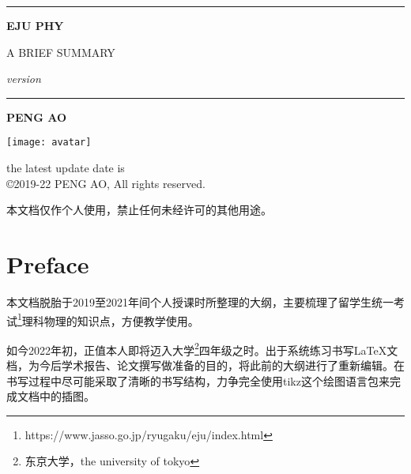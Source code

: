 
\begin{titlepage}
    \begin{center}
        \vspace{4cm}
        
        \rule{\textwidth}{1.2pt}
        
        \vspace{0.3cm}

        {\Huge \textbf{EJU PHY}}

        \vspace{0.3cm}

        {\LARGE A BRIEF SUMMARY}

        \vspace{0.3cm}

        {\Large \textit{version \version}}

        \rule{\textwidth}{1.2pt}

        \vspace{2cm}

        {\LARGE \textbf{PENG AO}}

        \vfill

        \texttt{[image: avatar]}

        {\Large the latest update date is \updatedate\\
        \copyright2019-22 PENG AO, All rights reserved.}
    \end{center}
\end{titlepage}


\clearpage
\begin{center}
    本文档仅作个人使用，禁止任何未经许可的其他用途。
\end{center}


\clearpage
\chapter*{Preface}

本文档脱胎于2019至2021年间个人授课时所整理的大纲，主要梳理了留学生统一考试\footnote{https://www.jasso.go.jp/ryugaku/eju/index.html}理科物理的知识点，方便教学使用。

如今2022年初，正值本人即将迈入大学\footnote{东京大学，the university of tokyo}四年级之时。出于系统练习书写\LaTeX 文档，为今后学术报告、论文撰写做准备的目的，将此前的大纲进行了重新编辑。在书写过程中尽可能采取了清晰的书写结构，力争完全使用tikz这个绘图语言包来完成文档中的插图。

